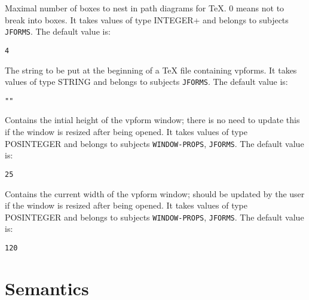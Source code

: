 \begin{description}
\item[VPFORM-TEX-NEST]  
Maximal number of boxes to nest in path diagrams for TeX.
0 means not to break into boxes.
It takes values of type INTEGER+ and belongs to subjects \texttt{JFORMS}.  The default value is: \begin{lstlisting}
4
\end{lstlisting}

\item[VPFORM-TEX-PREAMBLE]  
The string to be put at the beginning of a TeX file containing
vpforms.
It takes values of type STRING and belongs to subjects \texttt{JFORMS}.  The default value is: \begin{lstlisting}
""
\end{lstlisting}

\item[VPW-HEIGHT]  
Contains the intial height of the vpform window; there is no need to update
this if the window is resized after being opened.
It takes values of type POSINTEGER and belongs to subjects \texttt{WINDOW-PROPS}, \texttt{JFORMS}.  The default value is: \begin{lstlisting}
25
\end{lstlisting}

\item[VPW-WIDTH]  
Contains the current width of the vpform window; should be updated by the 
user if the window is resized after being opened.
It takes values of type POSINTEGER and belongs to subjects \texttt{WINDOW-PROPS}, \texttt{JFORMS}.  The default value is: \begin{lstlisting}
120
\end{lstlisting}

\item
\end{description}

\section{Semantics}

